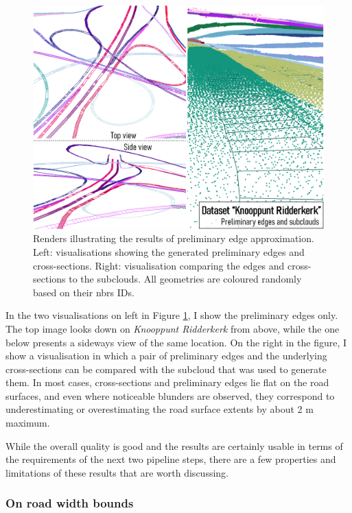 \begin{figure}
    \centering
    \includegraphics[width=\linewidth]{final_report/figs/edgeapproximation0.png}
    \caption[Renders illustrating the results of preliminary edge approximation]{Renders illustrating the results of preliminary edge approximation. Left: visualisations showing the generated preliminary edges and cross-sections. Right: visualisation comparing the edges and cross-sections to the subclouds. All geometries are coloured randomly based on their \ac{nbrs} IDs.}
    \label{fig:edgeapproximation0}
\end{figure}

In the two visualisations on left in Figure \ref{fig:edgeapproximation0}, I show the preliminary edges only. The top image looks down on \textit{Knooppunt Ridderkerk} from above, while the one below presents a sideways view of the same location. On the right in the figure, I show a visualisation in which a pair of preliminary edges and the underlying cross-sections can be compared with the subcloud that was used to generate them. In most cases, cross-sections and preliminary edges lie flat on the road surfaces, and even where noticeable blunders are observed, they correspond to underestimating or overestimating the road surface extents by about 2 m maximum.

While the overall quality is good and the results are certainly usable in terms of the requirements of the next two pipeline steps, there are a few properties and limitations of these results that are worth discussing.

\subsubsection{On road width bounds}

